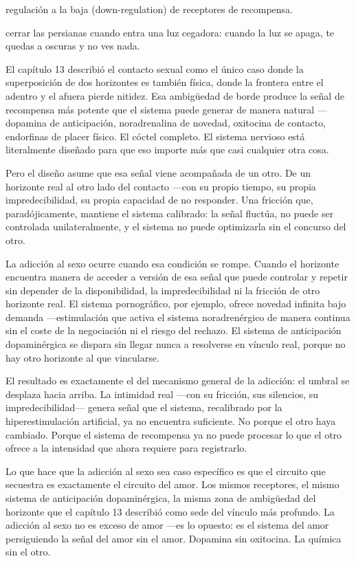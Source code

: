 \begin{fisica}
 regulación a la baja (down-regulation) de receptores de recompensa.

 cerrar las persianas cuando entra una luz cegadora: cuando la luz se apaga, te quedas a oscuras y no ves nada.
\end{fisica}
\noindent El capítulo 13 describió el contacto sexual como el único caso donde la superposición de dos horizontes es también física, donde la frontera entre el adentro y el afuera pierde nitidez. Esa ambigüedad de borde produce la señal de recompensa más potente que el sistema puede generar de manera natural —dopamina de anticipación, noradrenalina de novedad, oxitocina de contacto, endorfinas de placer físico. El cóctel completo. El sistema nervioso está literalmente diseñado para que eso importe más que casi cualquier otra cosa.

Pero el diseño asume que esa señal viene acompañada de un otro. De un horizonte real al otro lado del contacto —con su propio tiempo, su propia impredecibilidad, su propia capacidad de no responder. Una fricción que, paradójicamente, mantiene el sistema calibrado: la señal fluctúa, no puede ser controlada unilateralmente, y el sistema no puede optimizarla sin el concurso del otro.

La adicción al sexo ocurre cuando esa condición se rompe. Cuando el horizonte encuentra manera de acceder a versión de esa señal que puede controlar y repetir sin depender de la disponibilidad, la impredecibilidad ni la fricción de otro horizonte real. El sistema pornográfico, por ejemplo, ofrece novedad infinita bajo demanda —estimulación que activa el sistema noradrenérgico de manera continua sin el coste de la negociación ni el riesgo del rechazo. El sistema de anticipación dopaminérgica se dispara sin llegar nunca a resolverse en vínculo real, porque no hay otro horizonte al que vincularse.

El resultado es exactamente el del mecanismo general de la adicción: el umbral se desplaza hacia arriba. La intimidad real —con su fricción, sus silencios, su impredecibilidad— genera señal que el sistema, recalibrado por la hiperestimulación artificial, ya no encuentra suficiente. No porque el otro haya cambiado. Porque el sistema de recompensa ya no puede procesar lo que el otro ofrece a la intensidad que ahora requiere para registrarlo.

Lo que hace que la adicción al sexo sea caso específico es que el circuito que secuestra es exactamente el circuito del amor. Los mismos receptores, el mismo sistema de anticipación dopaminérgica, la misma zona de ambigüedad del horizonte que el capítulo 13 describió como sede del vínculo más profundo. La adicción al sexo no es exceso de amor —es lo opuesto: es el sistema del amor persiguiendo la señal del amor sin el amor. Dopamina sin oxitocina. La química sin el otro.

